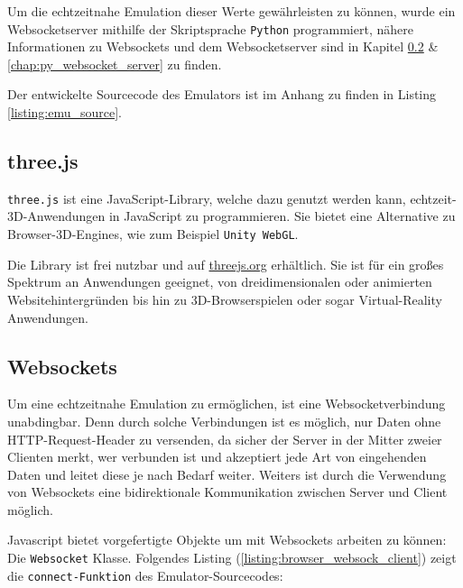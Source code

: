 \documentclass[paper=a4,12pt]{scrreprt}
\begin{document}
Um die echtzeitnahe Emulation dieser Werte gewährleisten zu können, wurde ein Websocketserver mithilfe der Skriptsprache \texttt{Python} programmiert, nähere Informationen
zu Websockets und dem Websocketserver sind in Kapitel \ref{ssec:websockets_emu} \& \ref{chap:py_websocket_server} zu finden.\newline

Der entwickelte Sourcecode des Emulators ist im Anhang zu finden in Listing \ref{listing:emu_source}.\newline

\subsection{three.js}
\label{ssec:three}
\texttt{three.js}\cite{threejs} ist eine JavaScript-Library, welche dazu genutzt werden kann, echtzeit-3D-Anwendungen in JavaScript zu programmieren.
Sie bietet eine Alternative zu Browser-3D-Engines, wie zum Beispiel \texttt{Unity WebGL}.

Die Library ist frei nutzbar und auf \hyperlink{threejs.org}{threejs.org}
erhältlich. Sie ist für ein großes Spektrum an Anwendungen geeignet, von
dreidimensionalen oder animierten Websitehintergründen bis hin zu 3D-Browserspielen
oder sogar Virtual-Reality Anwendungen.

\subsection{Websockets}
\label{ssec:websockets_emu}
Um eine echtzeitnahe Emulation zu ermöglichen, ist eine Websocketverbindung unabdingbar. Denn durch solche Verbindungen ist es möglich, nur Daten ohne HTTP-Request-Header zu versenden,
da sicher der Server in der Mitter zweier Clienten merkt, wer verbunden ist und akzeptiert jede Art von eingehenden Daten und leitet diese je nach Bedarf weiter.\newline
Weiters ist durch die Verwendung von Websockets eine bidirektionale Kommunikation zwischen Server und Client möglich.\newline

Javascript bietet vorgefertigte Objekte um mit Websockets arbeiten zu können: Die \texttt{Websocket} Klasse. Folgendes Listing (\ref{listing:browser_websock_client}) zeigt die \texttt{connect-Funktion} des Emulator-Sourcecodes:\newline
\end{document}
